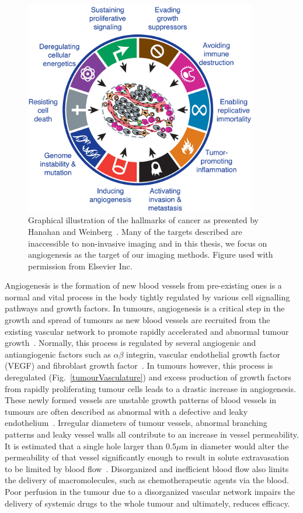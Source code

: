 \begin{figure}[htbp]   
 \begin{center}  
 \includegraphics[width=4in]{intro/./intro-images/cancerHallmarks.png}
 \caption{Graphical illustration of the hallmarks of cancer as presented by Hanahan and Weinberg~\cite{Hanahan:2011gu}. Many of the targets described are inaccessible to non-invasive imaging and in this thesis, we focus on angiogenesis as the target of our imaging methods. Figure used with permission from Elsevier Inc.}  
 \label{cancerHallmarks}  
 \end{center}
\end{figure}

Angiogenesis is the formation of new blood vessels from pre-existing ones is a normal and vital process in the body tightly regulated by various cell signalling pathways and growth factors.
In tumours, angiogenesis is a critical step in the growth and spread of tumours as new blood vessels are recruited from the existing vascular network to promote rapidly accelerated and abnormal tumour growth~\cite{Folkman:1990ud}.
Normally, this process is regulated by several angiogenic and antiangiogenic factors such as $\alpha \beta$ integrin, vascular endothelial growth factor (\acs{VEGF}) and fibroblast growth factor~\cite{Laking:2006ij}.
In tumours however, this process is deregulated (Fig.~\ref{tumourVasculature}) and excess production of growth factors from rapidly proliferating tumour cells leads to a drastic increase in angiogenesis.
These newly formed vessels are unstable growth patterns of blood vessels in tumours are often described as abnormal with a defective and leaky endothelium~\cite{McDonald:2002ut}.
Irregular diameters of tumour vessels, abnormal branching patterns and leaky vessel walls all contribute to an increase in vessel permeability.
It is estimated that a single hole larger than 0.5$\mu$m in diameter would alter the permeability of that vessel significantly enough to result in solute extravasation to be limited by blood flow~\cite{McDonald:2002ut}.
Disorganized and inefficient blood flow also limits the delivery of macromolecules, such as chemotherapeutic agents via the blood.
Poor perfusion in the tumour due to a disorganized vascular network impairs the delivery of systemic drugs to the whole tumour and ultimately, reduces efficacy.

